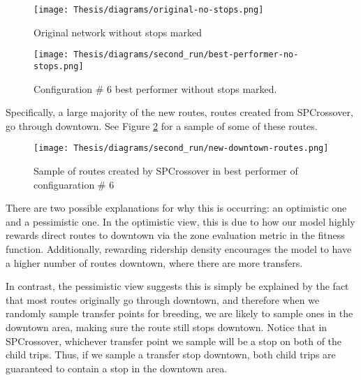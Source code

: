 \documentclass[11pt]{amsart}
\theoremstyle{definition}                  %
\theoremstyle{remark}                       %
\numberwithin{equation}{section}
\begin{document}
\begin{figure}
\centering
\begin{minipage}{.5\textwidth}
  \centering
  \texttt{[image: Thesis/diagrams/original-no-stops.png]}
  \caption{Original network without stops marked}
  \label{fig:original-no-stops}
\end{minipage}%
\begin{minipage}{.5\textwidth}
  \centering
  \texttt{[image: Thesis/diagrams/second\_run/best-performer-no-stops.png]}
  \caption{Configuration \# 6 best performer without stops marked.}
  \label{fig:6bestperformer-no-stops}
\end{minipage}
\end{figure}

Specifically, a large majority of the new routes, routes created from SPCrossover, go through downtown. See Figure \ref{fig:downtown-routes} for a sample of some of these routes. 

\begin{figure}
    \centering
    \texttt{[image: Thesis/diagrams/second\_run/new-downtown-routes.png]}
    \caption{Sample of routes created by SPCrossover in best performer of configuaration \# 6}
    \label{fig:downtown-routes}
\end{figure}

There are two possible explanations for why this is occurring: an optimistic one and a pessimistic one. In the optimistic view, this is due to how our model highly rewards direct routes to downtown via the zone evaluation metric in the fitness function. Additionally, rewarding ridership density encourages the model to have a higher number of routes downtown, where there are more transfers. 

In contrast, the pessimistic view suggests this is simply be explained by the fact that most routes originally go through downtown, and therefore when we randomly sample transfer points for breeding, we are likely to sample ones in the downtown area, making sure the route still stops downtown. Notice that in SPCrossover, whichever transfer point we sample will be a stop on both of the child trips. Thus, if we sample a transfer stop downtown,  both child trips are guaranteed to contain a stop in the downtown area. 
\end{document}
